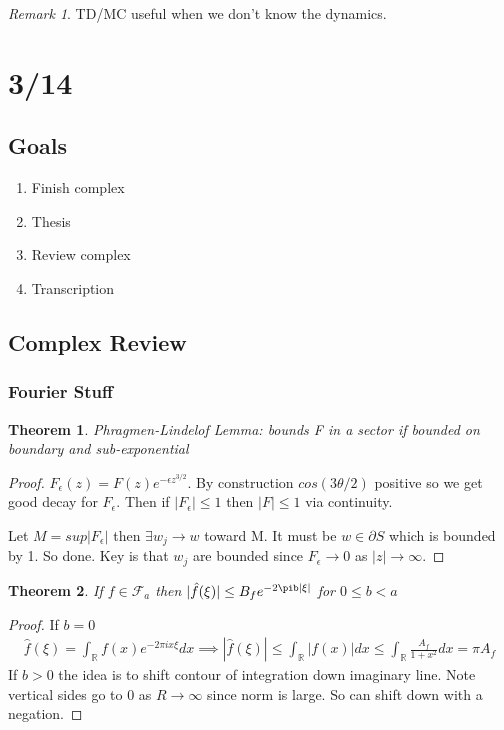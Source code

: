 \documentclass[11pt]{article}
\newcommand{\R}{\mathbb{R}}
\newtheorem{theorem}{Theorem}
\theoremstyle{remark}
\newtheorem{remark}{Remark}
\begin{document}
\begin{remark}
	TD/MC useful when we don't know the dynamics.
\end{remark}

\section{3/14}

\subsection{Goals}

\begin{enumerate}
	\item Finish complex
	\item Thesis
	\item Review complex
	\item Transcription
\end{enumerate}

\subsection{Complex Review}

\subsubsection{Fourier Stuff}

\begin{theorem}
	Phragmen-Lindelof Lemma: bounds F in a sector if bounded on boundary and sub-exponential
\end{theorem}

\begin{proof}
	$F_{\epsilon}(z) = F(z)e^{-\epsilon z^{3/2}}$. By construction $cos(3\theta /2)$ positive so we get good decay for $F_{\epsilon}$. Then if $|F_{\epsilon}| \leq 1$ then $|F| \leq 1$ via continuity.

	Let $M = sup|F_{\epsilon}|$ then $\exists w_j \to w$ toward M. It must be $w \in \partial S$ which is bounded by 1. So done. Key is that $w_j$ are bounded since $F_{\epsilon} \to 0$ as $|z| \to \infty$. 
\end{proof}

\begin{theorem}
	If $f \in \mathcal{F}_a$ then $|\hat{f}(\xi)| \leq B_f e^{-2\pib |\xi|}$ for $0 \leq b < a$
\end{theorem}

\begin{proof}
	If $b=0$
	\begin{align*}
		\hat{f}(\xi) = \int_{\R}f(x)e^{-2\pi i x \xi}dx \implies |\hat{f}(\xi)| \leq \int_{\R}|f(x)|dx \leq \int_{\R}\frac{A_f}{1+x^2}dx = \pi A_f
	\end{align*}
	If $b > 0$ the idea is to shift contour of integration down imaginary line. Note vertical sides go to 0 as $R \to \infty$ since norm is large. So can shift down with a negation.
\end{proof}
\end{document}
